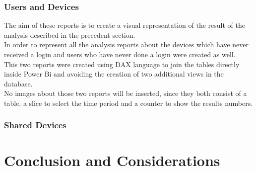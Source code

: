 \documentclass[12pt, a4paper, oneside]{article}
\begin{document}
\subsubsection{Users and Devices}
The aim of these reports is to create a visual representation of the result of the analysis described in the precedent section. \\
In order to represent all the analysis reports about the devices which have never received a login and users who have never done a login were created as well.\\
This two reports were created using DAX language to join the tables directly inside Power Bi and avoiding the creation of two additional views in the database.\\
No images about those two reports will be inserted, since they both consist of a table, a slice to select the time period and a counter to show the results numbers.

\subsubsection{Shared Devices}





\section{Conclusion and Considerations}
\end{document}
